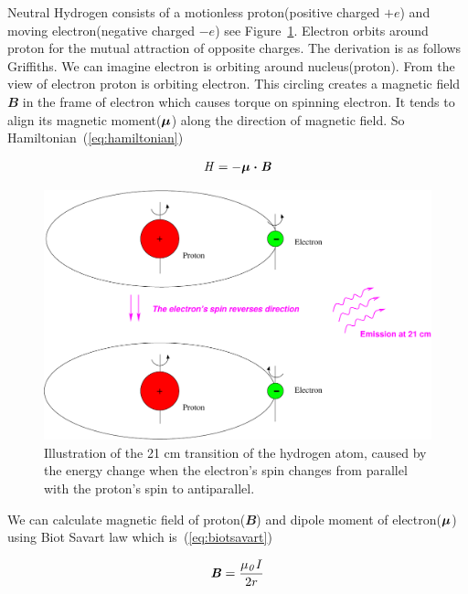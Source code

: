 \documentclass[fleqn,usenatbib]{mnras}
\begin{document}
Neutral Hydrogen consists of a motionless proton(positive charged $+e$) and moving electron(negative charged $-e$) see Figure~\ref{fig:hyperfine_figure}. Electron orbits around proton for the mutual attraction of opposite charges. The derivation is as follows Griffiths\citep{griffiths2016introduction}. We can imagine electron is orbiting around nucleus(proton). From the view of electron proton is orbiting electron. This circling creates a magnetic field $\mathbfit{B}$ in the frame of electron which causes torque on spinning electron. It tends to align its magnetic moment($\bmath{\mathit{\umu}}$) along the direction of magnetic field. So Hamiltonian~(\ref{eq:hamiltonian})

\begin{equation}
  \mathit{H}=-\bmath{\mathit{\umu}\cdot\mathit{B}}
  \label{eq:hamiltonian} 
\end{equation}

\begin{figure}
 \includegraphics[width=\columnwidth]{hyperfine}
 \caption{Illustration of the 21 cm transition of the hydrogen atom, caused by the energy change
when the electron's spin changes from parallel with the proton's spin to antiparallel.}
 \label{fig:hyperfine_figure}
\end{figure}  

We can calculate magnetic field of proton($\mathbfit{B}$) and dipole moment of electron($\bmath{\mathit{\umu}}$) using Biot Savart law which is~(\ref{eq:biotsavart})

\begin{equation}
  \textbf{\textit{B}}=\frac{\mathit{\mu_{0}I}}{2r}
  \label{eq:biotsavart}
\end{equation}
\end{document}
